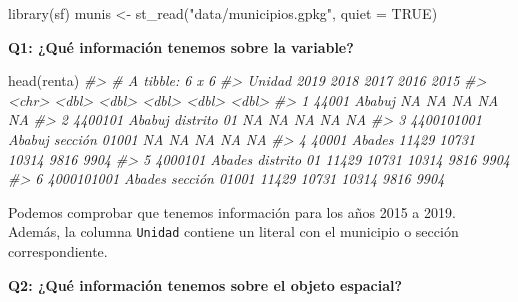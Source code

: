 \documentclass[
]{report}
\newenvironment{Shaded}{\begin{snugshade}}{\end{snugshade}}
\newcommand{\AttributeTok}[1]{\textcolor[rgb]{0.77,0.63,0.00}{#1}}
\newcommand{\CommentTok}[1]{\textcolor[rgb]{0.56,0.35,0.01}{\textit{#1}}}
\newcommand{\ConstantTok}[1]{\textcolor[rgb]{0.00,0.00,0.00}{#1}}
\newcommand{\FunctionTok}[1]{\textcolor[rgb]{0.00,0.00,0.00}{#1}}
\newcommand{\NormalTok}[1]{#1}
\newcommand{\OtherTok}[1]{\textcolor[rgb]{0.56,0.35,0.01}{#1}}
\newcommand{\StringTok}[1]{\textcolor[rgb]{0.31,0.60,0.02}{#1}}
\theoremstyle{definition}
\theoremstyle{definition}
\theoremstyle{definition}
\theoremstyle{definition}
\theoremstyle{remark}
\begin{document}
\begin{Shaded}
\begin{Highlighting}[]
\FunctionTok{library}\NormalTok{(sf)}
\NormalTok{munis }\OtherTok{\textless{}{-}} \FunctionTok{st\_read}\NormalTok{(}\StringTok{"data/municipios.gpkg"}\NormalTok{, }\AttributeTok{quiet =} \ConstantTok{TRUE}\NormalTok{)}
\end{Highlighting}
\end{Shaded}

\textbf{Q1: ¿Qué información tenemos sobre la variable?}

\begin{Shaded}
\begin{Highlighting}[]
\FunctionTok{head}\NormalTok{(renta)}
\CommentTok{\#\textgreater{} \# A tibble: 6 x 6}
\CommentTok{\#\textgreater{}   Unidad                          \textasciigrave{}2019\textasciigrave{} \textasciigrave{}2018\textasciigrave{} \textasciigrave{}2017\textasciigrave{} \textasciigrave{}2016\textasciigrave{} \textasciigrave{}2015\textasciigrave{}}
\CommentTok{\#\textgreater{}   \textless{}chr\textgreater{}                            \textless{}dbl\textgreater{}  \textless{}dbl\textgreater{}  \textless{}dbl\textgreater{}  \textless{}dbl\textgreater{}  \textless{}dbl\textgreater{}}
\CommentTok{\#\textgreater{} 1 44001 Ababuj                        NA     NA     NA     NA     NA}
\CommentTok{\#\textgreater{} 2 4400101 Ababuj distrito 01          NA     NA     NA     NA     NA}
\CommentTok{\#\textgreater{} 3 4400101001 Ababuj sección 01001     NA     NA     NA     NA     NA}
\CommentTok{\#\textgreater{} 4 40001 Abades                     11429  10731  10314   9816   9904}
\CommentTok{\#\textgreater{} 5 4000101 Abades distrito 01       11429  10731  10314   9816   9904}
\CommentTok{\#\textgreater{} 6 4000101001 Abades sección 01001  11429  10731  10314   9816   9904}
\end{Highlighting}
\end{Shaded}

Podemos comprobar que tenemos información para los años 2015 a 2019. Además, la
columna \texttt{Unidad} contiene un literal con el municipio o sección correspondiente.

\textbf{Q2: ¿Qué información tenemos sobre el objeto espacial?}
\end{document}

